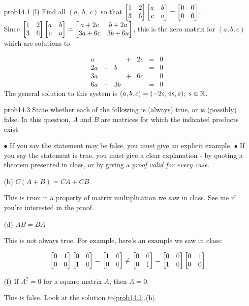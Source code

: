 \begin{sol}{prob14.1}
(l)  Find  all $ (a,\ b,\ c)$ so that $\bmatrix 1&
2\\ 3&6\endbmatrix \bmatrix a&b\\ c&a\endbmatrix=\bmatrix0&0\cr 0&0\endbmatrix
 $.\\


\soln Since  $\bmatrix 1&
2\\ 3&6\endbmatrix \bmatrix a&b\\ c&a\endbmatrix= \bmatrix a+2c&
b+2a\\ 3a+6c&3b+6a\endbmatrix$, this is the zero matrix for $(a,b,c)$ which are solutions to

$$\begin{matrix}  
a& & &+&2c&=&0\\
2a & +&b& &    &=&0\\
3a& & &+&6c&=&0\\ 
6a & +&3b& &    &=&0 \end{matrix}. $$ The general solution to this system is $(a,b,c)=(-2s, 4s, s); \; s\in \mathbb{R}$. 
\end{sol}

\begin{sol}{prob14.3} State whether each of the following is (always) true,
or is (possibly) false.  In this question, $A$ and $B$ are matrices for which the indicated products exist.
   \smallskip    
 
$\bullet$ If you say the statement may be false, you must give an explicit example. 
\smallskip   
$\bullet$ If you say the statement is true, you must give a clear explanation -   by quoting a theorem presented in class, or by giving a {\it proof valid for every  case}. 

\medskip

(b) $C(A+B)=CA+CB$

\soln This is true: it a property of matrix multiplication we saw in class. See me if you're interested in the proof.
\medskip
%

(d) $AB=BA$

\soln This is not always true. For example, here's an example we saw in class:

$$\bmatrix 0&1\\ 0&0\endbmatrix\bmatrix 0&0\\ 1&0\endbmatrix=\bmatrix 1&0\\ 0&0\endbmatrix\not=\bmatrix 0&0\\ 0&1\endbmatrix=\bmatrix 0&0\\ 1&0\endbmatrix\bmatrix 0&1\\ 0&0\endbmatrix$$
\medskip
%

(f)  If $A^2=0$ for a square matrix $A$, then $A=0$.

\soln This is false. Look at the solution to\ref{prob14.1}.(h).
\medskip

 
\end{sol}


